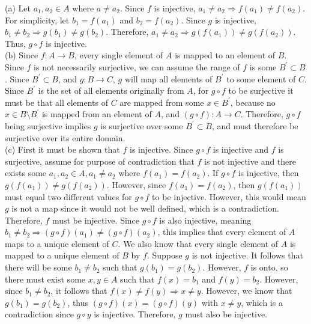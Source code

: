 \documentclass{article}
\theoremstyle{definition}
\begin{document}
(a) Let \(a_1,a_2\in A\) where \(a\neq a_2\). Since \(f\) is injective, \(a_1\neq a_2 \Longrightarrow f(a_1)\neq f(a_2)\). For simplicity, let \(b_1 =f(a_1)\) and \(b_2 =f(a_2)\). Since \(g\) is injective, \(b_1 \neq b_2 \Longrightarrow g(b_1)\neq g(b_2)\). Therefore, \(a_1 \neq a_2 \Longrightarrow g(f(a_1))\neq g(f(a_2))\). Thus, \(g\circ f\) is injective.\\
(b) Since \(f:A\to B\), every single element of \(A\) is mapped to an element of \(B\). Since \(f\) is not necessarily surjective, we can assume the range of \(f\) is some \(B^{\prime} \subset B\). Since \(B^{\prime} \subset B\), and \(g:B\to C\), \(g\) will map all elements of \(B^{\prime} \) to some element of \(C\). Since \(B^{\prime} \) is the set of all elements originally from \(A\), for \(g\circ f\) to be surjective it must be that all elements of \(C\) are mapped from some \(x\in B^{\prime} \), because no \(x\in B\setminus B^{\prime} \) is mapped from an element of \(A\), and \((g\circ f):A\to C\). Therefore, \(g\circ f\) being surjective implies \(g\) is surjective over some \(B^{\prime} \subset B\), and must therefore be surjective over its entire domain.\\
(c) First it must be shown that \(f\) is injective. Since \(g\circ f\) is injective and \(f\) is surjective, assume for purpose of contradiction that \(f\) is not injective and there exists some \(a_1,a_2\in A,a_1\neq a_2\) where \(f(a_1)=f(a_2)\). If \(g\circ f\) is injective, then \(g(f(a_1))\neq g(f(a_2))\). However, since \(f(a_1)=f(a_2)\), then \(g(f(a_1))\) must equal two different values for \(g\circ f\) to be injective. However, this would mean \(g\) is not a map since it would not be well defined, which is a contradiction. Therefore, \(f\) must be injective. Since \(g\circ f\) is also injective, meaning \(b_1\neq b_2 \Longrightarrow (g\circ f)(a_1)\neq (g\circ f)(a_2)\), this implies that every element of \(A\) maps to a unique element of \(C\). We also know that every single element of \(A\) is mapped to a unique element of \(B\) by \(f\). Suppose \(g\) is not injective. It follows that there will be some \(b_1 \neq b_2\) such that \(g(b_1)=g(b_2)\). However, \(f\) is onto, so there must exist some \(x,y\in A\) such that \(f(x)=b_1\) and \(f(y)=b_2\). However, since \(b_1 \neq b_2\), it follows that \(f(x)\neq f(y)\Longrightarrow x\neq y\). However, we know that \(g(b_1)=g(b_2)\), thus \((g\circ f)(x)=(g\circ f)(y)\) with \(x\neq y\), which is a contradiction since \(g\circ y\) is injective. Therefore, \(g\) must also be injective.\\
\end{document}
